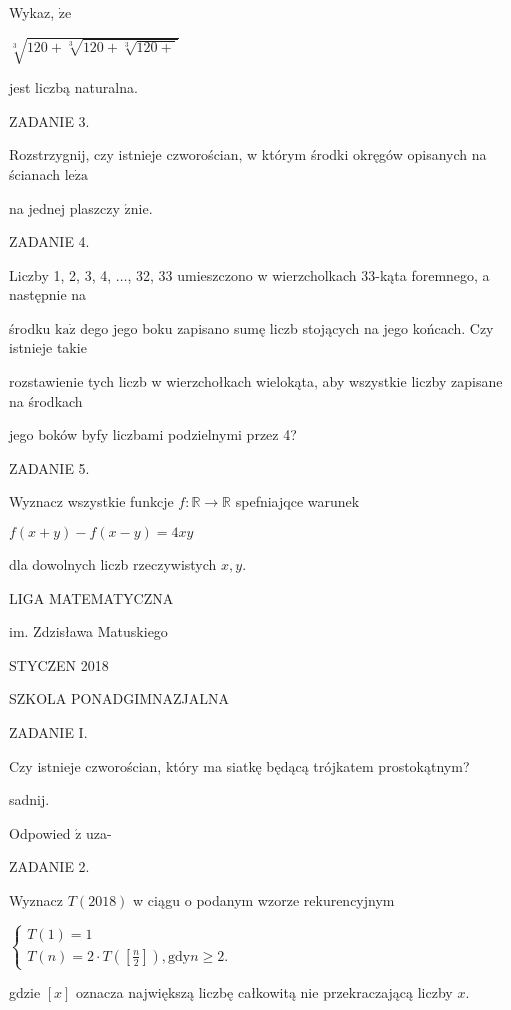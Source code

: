 \documentclass[a4paper,12pt]{article}
\begin{document}
Wykaz, $\dot{\mathrm{z}}\mathrm{e}$

$\sqrt[3]{120+\sqrt[3]{120+\sqrt[3]{120+}}}$

jest liczbą naturalna.

ZADANIE 3.

Rozstrzygnij, czy istnieje czworościan, w którym środki okręgów opisanych na ścianach $\mathrm{l}\mathrm{e}\dot{\mathrm{z}}\mathrm{a}$

na jednej plaszczy $\acute{\mathrm{z}}\mathrm{n}\mathrm{i}\mathrm{e}.$

ZADANIE 4.

Liczby 1, 2, 3, 4, $\ldots$, 32, 33 umieszczono w wierzcholkach 33-kąta foremnego, a następnie na

środku $\mathrm{k}\mathrm{a}\dot{\mathrm{z}}$ dego jego boku zapisano sumę liczb stojących na jego końcach. Czy istnieje takie

rozstawienie tych liczb w wierzchołkach wielokąta, aby wszystkie liczby zapisane na środkach

jego boków byfy liczbami podzielnymi przez 4?

ZADANIE 5.

Wyznacz wszystkie funkcje $f:\mathbb{R}\rightarrow \mathbb{R}$ spefniajqce warunek

$f(x+y)-f(x-y)=4xy$

dla dowolnych liczb rzeczywistych $x, y.$






LIGA MATEMATYCZNA

im. Zdzisława Matuskiego

STYCZEN 2018

SZKOLA PONADGIMNAZJALNA

ZADANIE I.

Czy istnieje czworościan, który ma siatkę będącą trójkatem prostokątnym?

sadnij.

Odpowied $\acute{\mathrm{z}}$ uza-

ZADANIE 2.

Wyznacz $T(2018)$ w ciągu o podanym wzorze rekurencyjnym

$\left\{\begin{array}{l}
T(1)=1\\
T(n)=2\cdot T([\frac{n}{2}]),\mathrm{g}\mathrm{d}\mathrm{y}n\geq 2.
\end{array}\right.$

gdzie $[x]$ oznacza największą liczbę całkowitą nie przekraczającą liczby $x.$
\end{document}
